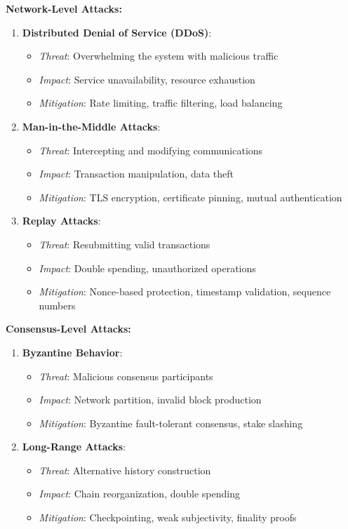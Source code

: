 \documentclass[11pt,a4paper]{article}
\begin{document}
\textbf{Network-Level Attacks:}
\begin{enumerate}
    \item \textbf{Distributed Denial of Service (DDoS)}:
    \begin{itemize}
        \item \textit{Threat}: Overwhelming the system with malicious traffic
        \item \textit{Impact}: Service unavailability, resource exhaustion
        \item \textit{Mitigation}: Rate limiting, traffic filtering, load balancing
    \end{itemize}
    
    \item \textbf{Man-in-the-Middle Attacks}:
    \begin{itemize}
        \item \textit{Threat}: Intercepting and modifying communications
        \item \textit{Impact}: Transaction manipulation, data theft
        \item \textit{Mitigation}: TLS encryption, certificate pinning, mutual authentication
    \end{itemize}
    
    \item \textbf{Replay Attacks}:
    \begin{itemize}
        \item \textit{Threat}: Resubmitting valid transactions
        \item \textit{Impact}: Double spending, unauthorized operations
        \item \textit{Mitigation}: Nonce-based protection, timestamp validation, sequence numbers
    \end{itemize}
\end{enumerate}

\textbf{Consensus-Level Attacks:}
\begin{enumerate}
    \item \textbf{Byzantine Behavior}:
    \begin{itemize}
        \item \textit{Threat}: Malicious consensus participants
        \item \textit{Impact}: Network partition, invalid block production
        \item \textit{Mitigation}: Byzantine fault-tolerant consensus, stake slashing
    \end{itemize}
    
    \item \textbf{Long-Range Attacks}:
    \begin{itemize}
        \item \textit{Threat}: Alternative history construction
        \item \textit{Impact}: Chain reorganization, double spending
        \item \textit{Mitigation}: Checkpointing, weak subjectivity, finality proofs
    \end{itemize}
\end{enumerate}
\end{document}
